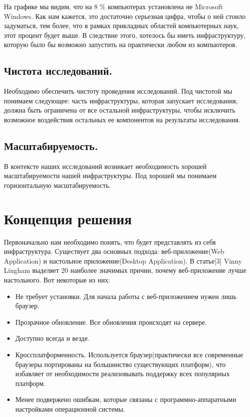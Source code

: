 \documentclass[12pt,a4paper]{extarticle}
\begin{document}
На графике мы видим, что на 8 \% компьютерах установлена не Microsoft Windows. Как нам кажется, это достаточно серьезная цифра, чтобы о ней стоило задуматься, тем более, что в рамках прикладных областей компьютерных наук, этот процент будет выше. В следствие этого, хотелось бы иметь инфраструктуру, которую было бы возможно  запустить на практически любом из компьютеров.

\subsection{Чистота исследований.} 
Необходимо обеспечить чистоту проведения исследований. Под чистотой мы понимаем следующее: часть инфраструктуры, которая запускает исследования, должна быть ограничена от все остальной инфраструктуры, чтобы исключить возможное воздействия остальных ее компонентов на результаты исследования.

\subsection{Масштабируемость.}
В контексте наших исследований возникает необходимость хорошей масштабируемости нашей инфраструктуры. Под хорошей мы понимаем горизонтальную масштабируемость. 


\newpage

\section{Концепция решения}
Первоначально нам необходимо понять, что будет представлять из себя инфраструктура. Существует два основных подхода: веб-приложение(Web Application) и настольное приложение(Desktop Application). В статье[3] Vinny Lingham выделяет 20 наиболее значимых причин, почему веб-приложение лучше настольного. Вот некоторые из них:
\begin{itemize}
	\item Не требует установки. Для начала работы с веб-приложением нужен лишь браузер.
	\item Прозрачное обновление. Все обновления происходят на сервере.
	\item Доступно всегда и везде. 
	\item Кроссплатформенность. Используется браузер(практически все современные браузеры портированы на большинство существующих платформ), что избавляет от необходимости реализовывать поддержку всех популярных платформ.
	\item Менее подвержено ошибкам, которые связаны с программно-аппаратными настройками операционной системы.
\end{itemize}
\end{document}
